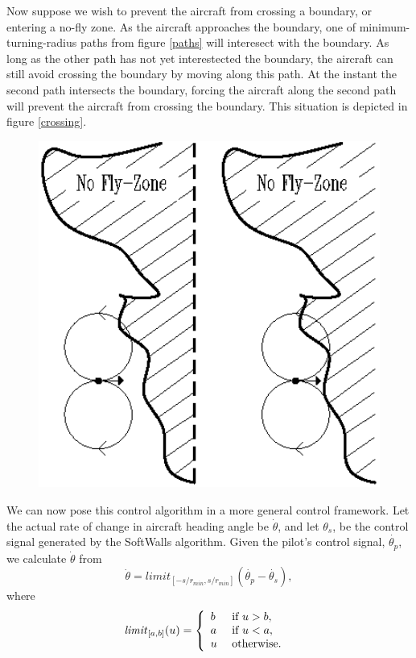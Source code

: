 \documentclass[11pt]{article}
\begin{document}
Now suppose we wish to prevent the aircraft from crossing a boundary,
or entering a no-fly zone.  As the aircraft approaches the boundary,
one of minimum-turning-radius paths from figure \ref{paths} will
interesect with the boundary.  As long as the other path has not yet
interestected the boundary, the aircraft can still avoid crossing the
boundary by moving along this path.  At the instant the second path
intersects the boundary, forcing the aircraft along the second path
will prevent the aircraft from crossing the boundary.  This situation
is depicted in figure \ref{crossing}.

\begin{figure}[btp]
\centering
\includegraphics[width=5in]{boundarycross.eps}
\end{figure}

We can now pose this control algorithm in a more general control
framework.  Let the actual rate of change in aircraft heading angle be
$\dot{\theta}$, and let $\theta_{s}$, be the control signal generated
by the SoftWalls algorithm.  Given the pilot's control signal,
$\dot{\theta_{p}}$, we calculate $\dot{\theta}$ from
\[
\dot{\theta} = limit_{[-s/r_{min}, s/r_{min}]}(\dot{\theta_{p}} -
\dot{\theta_{s}}),
\]
where
\[
\mbox{\textit{limit}}_{[a,b]}(u) = \left \{
\begin{array}{ll}
b&\mbox{ if } u > b,\\
a&\mbox{ if } u < a,\\
u&\mbox{ otherwise. }
\end{array}
\right .
\]
\end{document}
